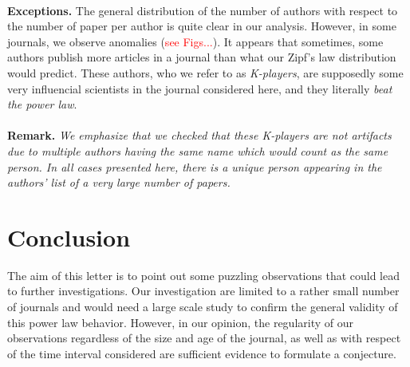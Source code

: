 \documentclass[9pt,twocolumn,twoside]{pnas-new}
\begin{document}
\paragraph{}
{\bf Exceptions. }
The general distribution of the number of authors with respect to the number of paper per author is quite clear in our analysis. 
However, in some journals, we observe anomalies (\textcolor{red}{see Figs...}). 
It appears that sometimes, some authors publish more articles in a journal than what our Zipf's law distribution would predict. 
These authors, who we refer to as \emph{K-players}, are supposedly some very influencial scientists in the journal considered here, and they literally \emph{beat the power law}.

\paragraph{}
{\bf Remark.}\textit{
We emphasize that we checked that these K-players are not artifacts due to multiple authors having the same name which would count as the same person. 
In all cases presented here, there is a unique person appearing in the authors' list of a very large number of papers. 
}

\section{Conclusion}
The aim of this letter is to point out some puzzling observations that could lead to further investigations. 
Our investigation are limited to a rather small number of journals and would need a large scale study to confirm the general validity of this power law behavior. 
However, in our opinion, the regularity of our observations regardless of the size and age of the journal, 
as well as with respect of the time interval considered are sufficient evidence to formulate a conjecture. 




\end{document}
